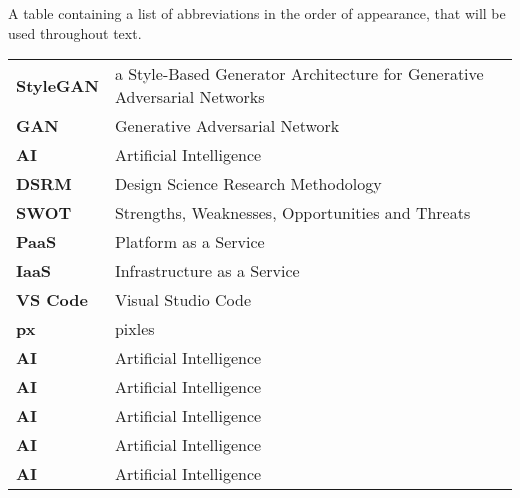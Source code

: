 \documentclass[a4paper,oneside,12pt]{book}
\begin{document}
\begin{TableOfAbbrev}
			A table containing a list of abbreviations in the order of appearance, that will be used throughout text.
			\begin{table}[!htpb!]%
			\begin{tabular}{ll}
			\textbf{StyleGAN} & a Style-Based Generator Architecture for Generative Adversarial Networks\\
			\textbf{GAN} & Generative Adversarial Network\\
			\textbf{AI} & Artificial Intelligence\\
			\textbf{DSRM} & Design Science Research Methodology\\
			\textbf{SWOT} & Strengths, Weaknesses, Opportunities and Threats\\
			\textbf{PaaS} & Platform as a Service\\
			\textbf{IaaS} & Infrastructure as a Service\\
			\textbf{VS Code} & Visual Studio Code\\
			\textbf{px} & pixles\\
			\textbf{AI} & Artificial Intelligence\\
			\textbf{AI} & Artificial Intelligence\\
			\textbf{AI} & Artificial Intelligence\\
			\textbf{AI} & Artificial Intelligence\\
			\textbf{AI} & Artificial Intelligence\\
			\end{tabular}
			\end{table}
\end{TableOfAbbrev}

\pagestyle{fancy}
\setcounter{page}{1}
\fancyhead{}
\renewcommand{\headrulewidth}{0pt}
\fancyfoot[c]{\thepage}









\appendix			




\end{document}

